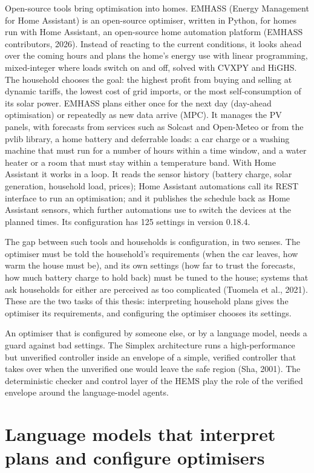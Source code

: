 \documentclass[12pt,a4paper]{report}
\begin{document}
Open-source tools bring optimisation into homes. EMHASS (Energy
Management for Home Assistant) is an open-source optimiser, written in
Python, for homes run with Home Assistant, an open-source home
automation platform (EMHASS contributors, 2026). Instead of reacting to the
current conditions, it looks ahead over the coming hours and plans the
home's energy use with linear programming, mixed-integer where loads
switch on and off, solved with CVXPY and HiGHS. The household chooses
the goal: the highest profit from buying and selling at dynamic
tariffs, the lowest cost of grid imports, or the most self-consumption
of its solar power. EMHASS plans either once for the next day
(day-ahead optimisation) or repeatedly as new data arrive (MPC). It
manages the PV panels, with forecasts from services such as Solcast
and Open-Meteo or from the pvlib library, a home battery and
deferrable loads: a car charge or a washing machine that must run for
a number of hours within a time window, and a water heater or a room
that must stay within a temperature band. With Home Assistant it works
in a loop. It reads the sensor history (battery charge, solar
generation, household load, prices); Home Assistant automations call
its REST interface to run an optimisation; and it publishes the
schedule back as Home Assistant sensors, which further automations use
to switch the devices at the planned times. Its configuration has 125
settings in version 0.18.4.

The gap between such tools and households is
configuration, in two senses. The optimiser must be told the household's
requirements (when the car leaves, how warm the house must be), and its
own settings (how far to trust the forecasts, how much battery charge
to hold back) must be tuned to the house; systems that ask households
for either are perceived as too complicated (Tuomela et al., 2021).
These are the two tasks of this thesis: interpreting household plans
gives the optimiser its requirements, and configuring the optimiser
chooses its settings.

An optimiser that is configured by someone else, or by a language model,
needs a guard against bad settings. The Simplex architecture runs a
high-performance but unverified controller inside an envelope of a
simple, verified controller that takes over when the unverified one
would leave the safe region (Sha, 2001). The deterministic
checker and control layer of the HEMS play the role of the verified
envelope around the language-model agents.

\section{Language models that interpret plans and configure optimisers}
\label{sec:litlm}
\end{document}
